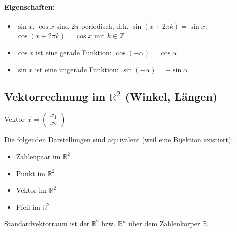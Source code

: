 \paragraph{Eigenschaften:}
\begin{itemize}
	\item $\sin x$, $\cos x$ sind $2\pi$-periodisch, d.h. $\sin(x + 2\pi k) = \sin x$; $\cos(x + 2\pi k) = \cos x$ mit $k \in \mathbb{Z}$
	\item $\cos x$ ist eine gerade Funktion: $\cos(-\alpha) = \cos\alpha$
	\item $\sin x$ ist eine ungerade Funktion: $\sin(-\alpha) = -\sin\alpha$
\end{itemize}

\subsection{Vektorrechnung im $\mathbb{R}^2$ (Winkel, Längen)}
\begin{definition}
	Vektor $\vec{x} = \begin{pmatrix}x_1 \\ x_2\end{pmatrix}$
\end{definition}
Die folgenden Darstellungen sind äquivalent (weil eine Bijektion existiert):
\begin{itemize}
	\item Zahlenpaar im $\mathbb{R}^2$
	\item Punkt im $\mathbb{R}^2$
	\item Vektor im $\mathbb{R}^2$
	\item Pfeil im $\mathbb{R}^2$
\end{itemize}

Standardvektorraum ist der $\mathbb{R}^2$ bzw. $\mathbb{R}^n$ über dem Zahlenkörper $\mathbb{R}$.

